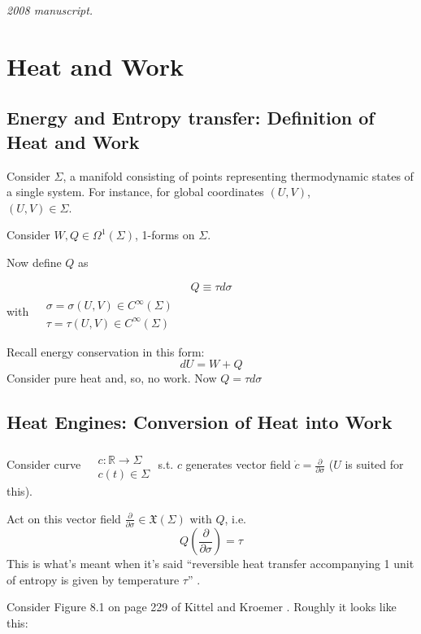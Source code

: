 \noindent\textit{2008 manuscript.}

\section{Heat and Work}

\subsection*{Energy and Entropy transfer: Definition of Heat and Work}

Consider $\Sigma$, a manifold consisting of points representing thermodynamic states of a single system.  For instance, for global coordinates $(U,V)$, \\
$(U,V) \in \Sigma$.  

Consider $W,Q \in \Omega^1(\Sigma)$, 1-forms on $\Sigma$.  

Now define $Q$ as 

\[
Q \equiv \tau d\sigma
\]
with $\begin{aligned}
 & \quad \\
  & \sigma = \sigma(U,V) \in C^{\infty}(\Sigma) \\
   & \tau = \tau(U,V) \in C^{\infty}(\Sigma) \end{aligned}$

Recall energy conservation in this form:
\[
dU = W + Q
\]
Consider pure heat and, so, no work.  Now $Q = \tau d\sigma$ 

\subsection*{Heat Engines: Conversion of Heat into Work}

Consider curve $\begin{aligned} & \quad \\ 
  & c : \mathbb{R} \to \Sigma \\
  & c(t) \in \Sigma \end{aligned}$ s.t. $c$ generates vector field $\dot{c} = \frac{ \partial }{ \partial \sigma }$ ($U$ is suited for this).  

Act on this vector field $\frac{ \partial }{ \partial \sigma} \in \mathfrak{X}(\Sigma)$ with $Q$, i.e.
\[
Q \left( \frac{ \partial }{ \partial \sigma } \right) = \tau
\]
This is what's meant when it's said ``reversible heat transfer accompanying 1 unit of entropy is given by temperature $\tau$'' \cite{CKittelHKroemer1980}.  

Consider Figure 8.1 on page 229 of Kittel and Kroemer \cite{CKittelHKroemer1980}.  Roughly it looks like this:

